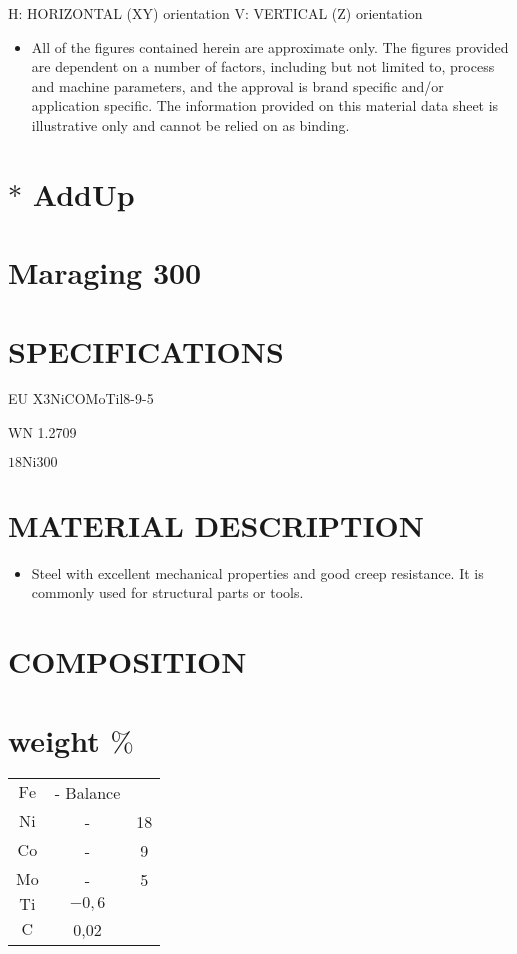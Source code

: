 \documentclass[10pt]{article}
\begin{document}
H: HORIZONTAL (XY) orientation V: VERTICAL (Z) orientation

\begin{itemize}
  \item All of the figures contained herein are approximate only. The figures provided are dependent on a number of factors, including but not limited to, process and machine parameters, and the approval is brand specific and/or application specific. The information provided on this material data sheet is illustrative only and cannot be relied on as binding.
\end{itemize}

\section*{$*$ AddUp}
\section*{Maraging 300}
\section*{SPECIFICATIONS}
EU X3NiCOMoTil8-9-5

WN 1.2709

$18 \mathrm{Ni300}$

\section*{MATERIAL DESCRIPTION}
\begin{itemize}
  \item Steel with excellent mechanical properties and good creep resistance. It is commonly used for structural parts or tools.
\end{itemize}

\section*{COMPOSITION}
\section*{weight $\%$}
\begin{center}
\begin{tabular}{ccc}
$\mathrm{Fe}$ & - Balance &  \\
$\mathrm{Ni}$ & - & 18 \\
$\mathrm{Co}$ & - & 9 \\
$\mathrm{Mo}$ & - & 5 \\
$\mathrm{Ti}$ & $-0,6$ &  \\
$\mathrm{C}$ & 0,02 &  \\
\end{tabular}
\end{center}
\end{document}
